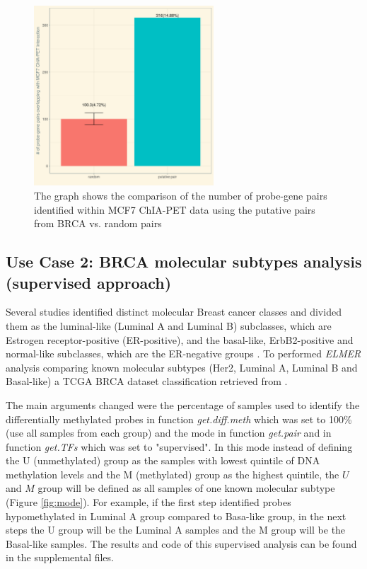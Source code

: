 %

\begin{figure}[ht!]
\centering
\includegraphics[width=0.6\textwidth]{images/validation.png}
\caption[MCF7 ChIA-PET validation]{\label{fig:chiapet} The graph shows the comparison of the number of probe-gene pairs identified within MCF7 ChIA-PET data using the putative pairs from BRCA vs. random pairs}
\end{figure}


\newpage
\subsection{Use Case 2: BRCA molecular subtypes analysis (supervised approach)}

Several studies identified distinct molecular Breast cancer classes and
divided them as the luminal-like (Luminal A and Luminal B) subclasses,
which are Estrogen receptor-positive (ER-positive), and the basal-like,
ErbB2-positive and normal-like subclasses, which are the ER-negative
groups \cite{perou2000molecular,yersal2014biological,sorlie2001gene}.
To performed \textit{ELMER} analysis comparing known molecular subtypes
(Her2, Luminal A, Luminal B and Basal-like) a TCGA BRCA dataset classification
retrieved from .


The main arguments changed were the percentage of samples used to identify the
differentially methylated probes in function \textit{get.diff.meth} which was
set to 100\% (use all samples from each group) and the mode in function \textit{get.pair}
and in function \textit{get.TFs} which was set to "supervised". In this mode instead
of defining the U (unmethylated) group as the samples with lowest quintile of DNA
methylation levels and the M (methylated) group as the highest quintile, the $U$ and $M$ group
 will be defined as all samples of one known molecular subtype (Figure \ref{fig:mode}).
 For example, if the first step identified probes hypomethylated in Luminal A group compared to Basa-like group,
in the next steps the U group will be the Luminal A samples and the M group will be the Basal-like samples.
The results and code of this supervised analysis can be found in the supplemental files.

